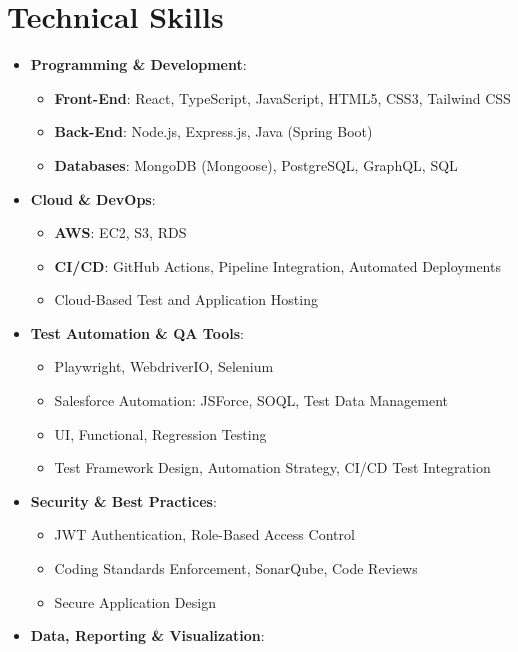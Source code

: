 \documentclass[letterpaper,10pt]{article}
\begin{document}
\section*{Technical Skills}
\begin{itemize}
    \item {
        \textbf{Programming \& Development}:
        \begin{itemize}
    	\item{\textbf{Front-End}: React, TypeScript, JavaScript, HTML5, CSS3, Tailwind CSS}
    	\item{\textbf{Back-End}: Node.js, Express.js, Java (Spring Boot)}
    	\item{\textbf{Databases}: MongoDB (Mongoose), PostgreSQL, GraphQL, SQL}
        \end{itemize}
    }
    \item {
        \textbf{Cloud \& DevOps}:
        \begin{itemize}
    	\item{\textbf{AWS}: EC2, S3, RDS}
    	\item{\textbf{CI/CD}: GitHub Actions, Pipeline Integration, Automated Deployments}
    	\item{Cloud-Based Test and Application Hosting}
        \end{itemize}
    }
    \item {
        \textbf{Test Automation \& QA Tools}:
        \begin{itemize}
    	\item{Playwright, WebdriverIO, Selenium}
    	\item{Salesforce Automation: JSForce, SOQL, Test Data Management}
    	\item{UI, Functional, Regression Testing}
    	\item{Test Framework Design, Automation Strategy, CI/CD Test Integration}
        \end{itemize}
    }
    \item {
        \textbf{Security \& Best Practices}:
        \begin{itemize}
    	\item{JWT Authentication, Role-Based Access Control}
    	\item{Coding Standards Enforcement, SonarQube, Code Reviews}
    	\item{Secure Application Design}
        \end{itemize}
    }
    \item {
        \textbf{Data, Reporting \& Visualization}:
        \begin{itemize}

\end{itemize}}
\end{itemize}
\end{document}
